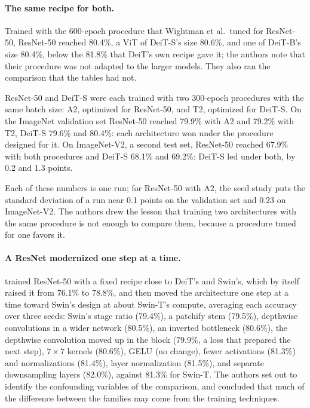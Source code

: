 \begin{refsection}
\paragraph{The same recipe for both.} Trained with the 600-epoch procedure that Wightman et al.\ tuned for ResNet-50, ResNet-50 reached 80.4\%, a ViT of DeiT-S's size 80.6\%, and one of DeiT-B's size 80.4\%, below the 81.8\% that DeiT's own recipe gave it; the authors note that their procedure was not adapted to the larger models. They also ran the comparison that the tables had not.

\begin{finding}\label{fd:confounding:crossover}
ResNet-50 and DeiT-S were each trained with two 300-epoch procedures with the same batch size: A2, optimized for ResNet-50, and T2, optimized for DeiT-S. On the ImageNet validation set ResNet-50 reached 79.9\% with A2 and 79.2\% with T2, DeiT-S 79.6\% and 80.4\%: each architecture won under the procedure designed for it. On ImageNet-V2, a second test set, ResNet-50 reached 67.9\% with both procedures and DeiT-S 68.1\% and 69.2\%: DeiT-S led under both, by 0.2 and 1.3 points.
\end{finding}

Each of these numbers is one run; for ResNet-50 with A2, the seed study puts the standard deviation of a run near 0.1 points on the validation set and 0.23 on ImageNet-V2. The authors drew the lesson that training two architectures with the same procedure is not enough to compare them, because a procedure tuned for one favors it.

\paragraph{A ResNet modernized one step at a time.} \Textcite{LiuEtAl2022} trained ResNet-50 with a fixed recipe close to DeiT's and Swin's, which by itself raised it from 76.1\% to 78.8\%, and then moved the architecture one step at a time toward Swin's design at about Swin-T's compute, averaging each accuracy over three seeds: Swin's stage ratio (79.4\%), a patchify stem (79.5\%), depthwise convolutions in a wider network (80.5\%), an inverted bottleneck (80.6\%), the depthwise convolution moved up in the block (79.9\%, a loss that prepared the next step), $7\times7$ kernels (80.6\%), GELU (no change), fewer activations (81.3\%) and normalizations (81.4\%), layer normalization (81.5\%), and separate downsampling layers (82.0\%), against 81.3\% for Swin-T. The authors set out to identify the confounding variables of the comparison, and concluded that much of the difference between the families may come from the training techniques.


\end{refsection}
